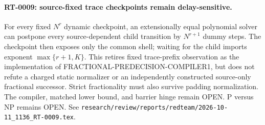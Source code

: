 \paragraph{RT-0009: source-fixed trace checkpoints remain delay-sensitive.}
For every fixed $N^r$ dynamic checkpoint, an extensionally equal polynomial
solver can postpone every source-dependent child transition by $N^{r+1}$
dummy steps.  The checkpoint then exposes only the common shell; waiting for
the child imports exponent $\max\{r+1,K\}$.  This retires fixed trace-prefix
observation as the implementation of FRACTIONAL-PREDECISION-COMPILER1, but
does not refute a charged static normalizer or an independently constructed
source-only fractional successor.  Strict fractionality must also survive
padding normalization.  The compiler, matched lower bound, and barrier hinge
remain OPEN.  P versus NP remains OPEN.  See
\texttt{research/review/reports/redteam/2026-10-11\_1136\_RT-0009.tex}.

